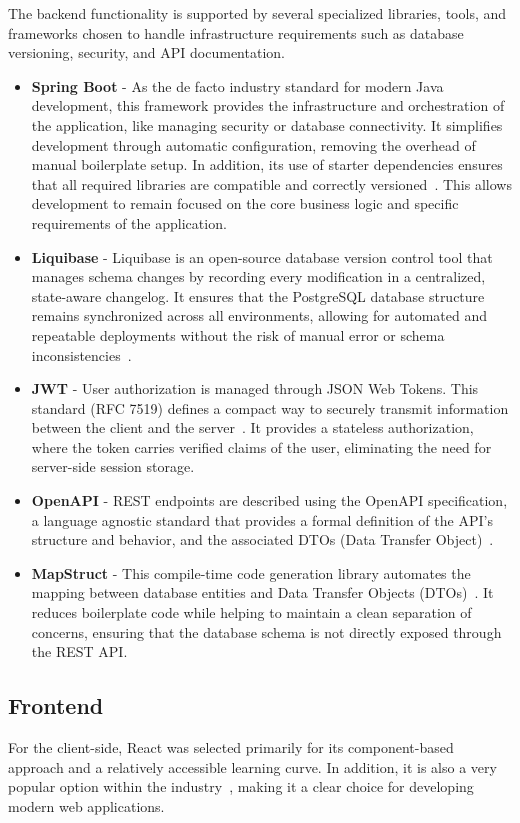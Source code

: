\documentclass{ctuthesis}
\begin{document}
The backend functionality is supported by several specialized libraries, tools, and frameworks chosen to handle infrastructure requirements such as database versioning, security, and API documentation.
\begin{itemize}
    \item \textbf{Spring Boot} - As the de facto industry standard for modern Java development, this framework provides the infrastructure and orchestration of the application, like managing security or database connectivity. It simplifies development through automatic configuration, removing the overhead of manual boilerplate setup. In addition, its use of starter dependencies ensures that all required libraries are compatible and correctly versioned~\cite{springboot}. This allows development to remain focused on the core business logic and specific requirements of the application.
    \item \textbf{Liquibase} - Liquibase is an open-source database version control tool that manages schema changes by recording every modification in a centralized, state-aware changelog. It ensures that the PostgreSQL database structure remains synchronized across all environments, allowing for automated and repeatable deployments without the risk of manual error or schema inconsistencies~\cite{liquibase}.
    \item \textbf{JWT} - User authorization is managed through JSON Web Tokens. This standard (RFC 7519) defines a compact way to securely transmit information between the client and the server~\cite{jwt}. It provides a stateless authorization, where the token carries verified claims of the user, eliminating the need for server-side session storage.
    \item \textbf{OpenAPI} - REST endpoints are described using the OpenAPI specification, a language agnostic standard that provides a formal definition of the API's structure and behavior, and the associated DTOs (Data Transfer Object)~\cite{openapi}.
    \item \textbf{MapStruct} - This compile-time code generation library automates the mapping between database entities and Data Transfer Objects (DTOs)~\cite{mapstruct}. It reduces boilerplate code while helping to maintain a clean separation of concerns, ensuring that the database schema is not directly exposed through the REST API.
\end{itemize}

\subsection{Frontend}
For the client-side, React was selected primarily for its component-based approach and a relatively accessible learning curve. In addition, it is also a very popular option within the industry~\cite{react}, making it a clear choice for developing modern web applications.
\end{document}
